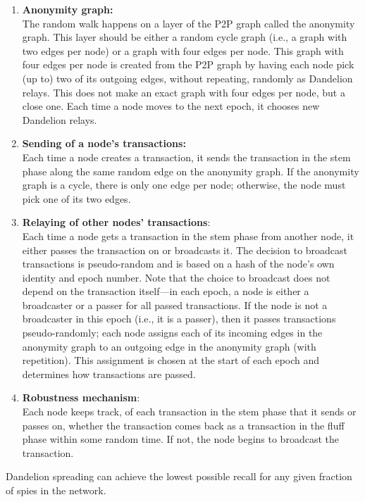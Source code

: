 \begin{enumerate}
    \item \textbf{Anonymity graph:}\\ The random walk happens on a layer of the P2P graph called the anonymity graph. This layer should be either a random cycle graph (i.e., a graph with two edges per node) or a graph with four edges per node. This graph with four edges per node is created from the P2P graph by having each node pick (up to) two of its outgoing edges, without repeating, randomly as Dandelion relays. This does not make an exact graph with four edges per node, but a close one. Each time a node moves to the next epoch, it chooses new Dandelion relays.
    \item \textbf{Sending of a node’s transactions:}\\ Each time a node creates a transaction, it sends the transaction in the stem phase along the same random edge on the anonymity graph. If the anonymity graph is a cycle, there is only one edge per node; otherwise, the node must pick one of its two edges.
    \item \textbf{Relaying of other nodes’ transactions}: \\  Each time a node gets a transaction in the stem phase from another node, it either passes the transaction on or broadcasts it. The decision to broadcast transactions is pseudo-random and is based on a hash of the node’s own identity and epoch number. Note that the choice to broadcast does not depend on the transaction itself—in each epoch, a node is either a broadcaster or a passer for all passed transactions. If the node is not a broadcaster in this epoch (i.e., it is a passer), then it passes transactions pseudo-randomly; each node assigns each of its incoming edges in the anonymity graph to an outgoing edge in the anonymity graph (with repetition). This assignment is chosen at the start of each epoch and determines how transactions are passed.
    \item \textbf{Robustness mechanism}:\\ Each node keeps track, of each transaction in the stem phase that it sends or passes on, whether the transaction comes back as a transaction in the fluff phase within some random time. If not, the node begins to broadcast the transaction.
\end{enumerate}
Dandelion spreading can achieve the lowest possible recall for any given fraction of spies in the network. 
